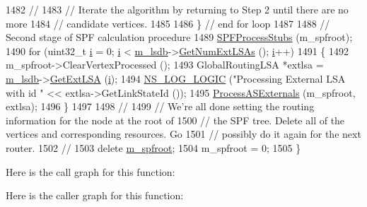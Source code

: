 \begin{DoxyCode}
1482 \textcolor{comment}{//}
1483 \textcolor{comment}{// Iterate the algorithm by returning to Step 2 until there are no more}
1484 \textcolor{comment}{// candidate vertices.}
1485 
1486     \}  \textcolor{comment}{// end for loop}
1487 
1488 \textcolor{comment}{// Second stage of SPF calculation procedure}
1489   \hyperlink{classns3_1_1GlobalRouteManagerImpl_a3d43e1ea8faefbbb7139b2ede6315cbb}{SPFProcessStubs} (m\_spfroot);
1490   \textcolor{keywordflow}{for} (uint32\_t \hyperlink{bernuolliDistribution_8m_a6f6ccfcf58b31cb6412107d9d5281426}{i} = 0; \hyperlink{bernuolliDistribution_8m_a6f6ccfcf58b31cb6412107d9d5281426}{i} < \hyperlink{classns3_1_1GlobalRouteManagerImpl_a7e528f818fa3e6c794b07c0b3cba5f61}{m\_lsdb}->\hyperlink{classns3_1_1GlobalRouteManagerLSDB_ac82114cbf8adfab500e580dd8d66ec69}{GetNumExtLSAs} (); \hyperlink{bernuolliDistribution_8m_a6f6ccfcf58b31cb6412107d9d5281426}{i}++)
1491     \{
1492       m\_spfroot->ClearVertexProcessed ();
1493       GlobalRoutingLSA *extlsa = \hyperlink{classns3_1_1GlobalRouteManagerImpl_a7e528f818fa3e6c794b07c0b3cba5f61}{m\_lsdb}->\hyperlink{classns3_1_1GlobalRouteManagerLSDB_aaf8413863f2002d3a2508e61c4cab64c}{GetExtLSA} (\hyperlink{bernuolliDistribution_8m_a6f6ccfcf58b31cb6412107d9d5281426}{i});
1494       \hyperlink{group__logging_ga88acd260151caf2db9c0fc84997f45ce}{NS\_LOG\_LOGIC} (\textcolor{stringliteral}{"Processing External LSA with id "} << extlsa->GetLinkStateId ());
1495       \hyperlink{classns3_1_1GlobalRouteManagerImpl_a1b3aa701b33156b04d351f33e3ebdcb4}{ProcessASExternals} (m\_spfroot, extlsa);
1496     \}
1497 
1498 \textcolor{comment}{//}
1499 \textcolor{comment}{// We're all done setting the routing information for the node at the root of}
1500 \textcolor{comment}{// the SPF tree.  Delete all of the vertices and corresponding resources.  Go}
1501 \textcolor{comment}{// possibly do it again for the next router.}
1502 \textcolor{comment}{//}
1503   \textcolor{keyword}{delete} \hyperlink{classns3_1_1GlobalRouteManagerImpl_a977f6b62ef1f1b58d041a2f49c093a1c}{m\_spfroot};
1504   m\_spfroot = 0;
1505 \}
\end{DoxyCode}


Here is the call graph for this function\+:




Here is the caller graph for this function\+:


